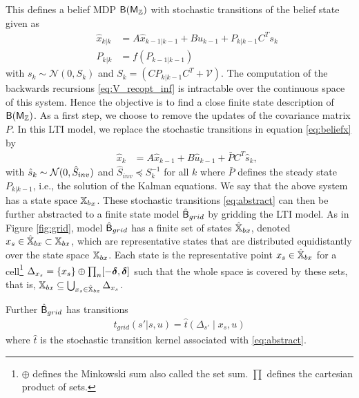 \documentclass{ifacconf}
\newcommand{\new}[1]{{\color{blue}#1}}
\begin{document}
This defines a belief MDP $\mathsf{B}{(\mathsf{M}_{{\mathbb{Z}}})}$ with stochastic transitions of the belief state given as 
\begin{align}
	&&\hat x_{k|k}&=A\hat x_{k-1|k-1}+Bu_{k-1}+P_{k|k-1}C^Ts_k\label{eq:beliefx}\\
	&&P_{k|k}&=f(P_{k-1|k-1})
\end{align}
with $s_k\sim \mathcal N (0, S_k )$ and  $S_k=\left(CP_{k|k-1}C^T+\mathcal V\right)$. 
\new{The computation of the backwards recursions \eqref{eq:V_recopt_inf} is intractable over the continuous space of this system. Hence the objective is to find a close finite state description of $\mathsf{B}{(\mathsf{M}_{{\mathbb{Z}}})}$.  As a first step, we choose to remove the updates of the covariance matrix $P$.  }
In this LTI model,  we replace the stochastic transitions  in equation \eqref{eq:beliefx} by
\begin{align}  
		&&\hat x_k &=A\hat x_{k-1} +B\hat u_{k-1} + \bar P  C^T  \hat{s}_k,\label{eq:abstract} 
\end{align}
with $ \hat{s}_k\sim \mathcal{N} (0,\hat{S}_{inv})$ and $\hat{S}_{inv}\preceq S_k^{-1}$ for all $k$ \new{where $\bar P$ defines the steady state $P_{k|k-1}$, i.e., the solution of the Kalman equations. We say that the above system has a state space ${{\mathbb{X}}_b}_{x}$.}
These stochastic transitions \eqref{eq:abstract} can then be further abstracted to a finite state model $\hat{\mathsf{B}}_{grid}$ by gridding the LTI model.
As in Figure \ref{fig:grid}, model  $\hat{\mathsf{B}}_{grid}$ has a finite set of states $ \hat {{\mathbb{X}}}_{bx}$, denoted $x_s\in \hat {{\mathbb{X}}}_{bx}\subset  {{\mathbb{X}}}_{bx}$,  which are representative states that are distributed  equidistantly over the state space $  {{\mathbb{X}}}_{bx}$.   
Each state is the representative point $x_s\in  \hat {{\mathbb{X}}}_{bx}$ for a cell\footnote{$\oplus$ defines the  Minkowski sum also called the set sum. $\prod$ defines the cartesian product of sets.}
 $\Delta_{x_s}=\{x_s\} \oplus \prod_n [-\boldsymbol{\delta}, \boldsymbol{\delta}]$ such that the whole space is covered by these sets, that is, ${{\mathbb{X}}}_{bx} \subseteq \bigcup_{x_s\in \hat {{\mathbb{X}}}_{bx}}\Delta_{x_s}$.


Further $\hat{\mathsf{B}}_{grid}$  has transitions 
\begin{align}\label{eq:tgrid}
t_{grid}(s'|s,u)=\hat t \left(\Delta_{s'}\mid x_s, u\right)
\end{align}where $\hat t$ is the stochastic transition kernel associated with \eqref{eq:abstract}.
\end{document}
